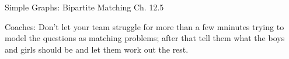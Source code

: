 \documentclass[handout]{mcs}
\begin{document}

\begin{staffnotes}
Simple Graphs: Bipartite Matching Ch. 12.5

Coaches: Don't let your team struggle for more than a few mninutes
trying to model the questions as matching problems; after that tell
them what the boys and girls should be and let them work out the rest.
\end{staffnotes}





\end{document}
